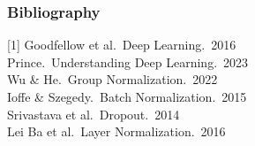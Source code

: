 \documentclass[xetex,professionalfont]{beamer}
\let\oldemph\emph
\renewcommand\emph[1]{\textcolor{tuwcvl_cvl_blue}{#1}}
\begin{document}
\renewcommand\emph[1]{\oldemph{#1}}

\begin{frame}
\frametitle{Bibliography}

[1] Goodfellow et al.~Deep Learning.~2016 \\\medskip
[2] Prince.~Understanding Deep Learning.~2023 \\\medskip
[3] Wu \& He.~Group Normalization.~2022 \\\medskip
[4] Ioffe \& Szegedy.~Batch Normalization.~2015 \\\medskip
[5] Srivastava et al.~Dropout.~2014 \\\medskip
[6] Lei Ba et al.~Layer Normalization.~2016

\end{frame}
\end{document}
